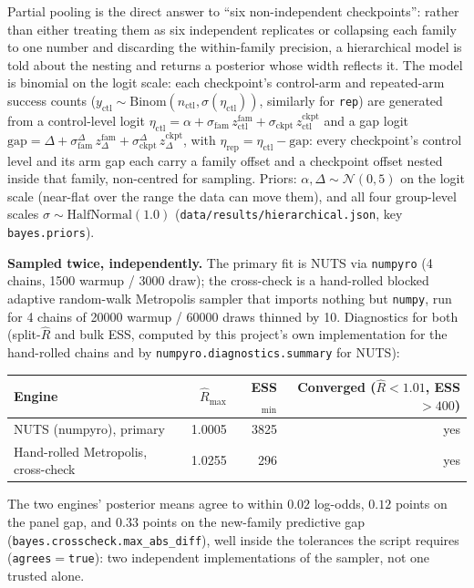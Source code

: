 \documentclass[11pt]{article}
\begin{document}
Partial pooling is the direct answer to ``six non-independent checkpoints'':
rather than either treating them as six independent replicates or collapsing
each family to one number and discarding the within-family precision, a
hierarchical model is told about the nesting and returns a posterior whose
width reflects it. The model is binomial on the logit scale: each checkpoint's
control-arm and repeated-arm success counts
($y_{\mathrm{ctl}}\sim\mathrm{Binom}(n_{\mathrm{ctl}},\sigma(\eta_{\mathrm{ctl}}))$,
similarly for \texttt{rep}) are generated from a control-level logit
$\eta_{\mathrm{ctl}} = \alpha + \sigma_{\mathrm{fam}}\,z^{\mathrm{fam}}_{\mathrm{ctl}} +
\sigma_{\mathrm{ckpt}}\,z^{\mathrm{ckpt}}_{\mathrm{ctl}}$ and a gap logit
$\mathrm{gap} = \Delta + \sigma_{\mathrm{fam}}^{\Delta}\,z^{\mathrm{fam}}_{\Delta} +
\sigma_{\mathrm{ckpt}}^{\Delta}\,z^{\mathrm{ckpt}}_{\Delta}$, with
$\eta_{\mathrm{rep}} = \eta_{\mathrm{ctl}} - \mathrm{gap}$: every checkpoint's
control level and its arm gap each carry a family offset and a checkpoint
offset nested inside that family, non-centred for sampling. Priors: $\alpha,
\Delta \sim \mathcal{N}(0,5)$ on the logit scale (near-flat over the range the
data can move them), and all four group-level scales
$\sigma\sim\mathrm{HalfNormal}(1.0)$ (\texttt{data/results/hierarchical.json},
key \texttt{bayes.priors}).

\noindent\textbf{Sampled twice, independently.} The primary fit is NUTS via
\texttt{numpyro} (4 chains, 1500 warmup / 3000 draw); the cross-check is a
hand-rolled blocked adaptive random-walk Metropolis sampler that imports
nothing but \texttt{numpy}, run for 4 chains of 20000 warmup / 60000 draws
thinned by 10. Diagnostics for both (split-$\hat R$ and bulk ESS, computed by
this project's own implementation for the hand-rolled chains and by
\texttt{numpyro.diagnostics.summary} for NUTS):

\begin{center}
\begin{tabular}{@{}lrrr@{}}
\toprule
Engine & $\hat R_{\max}$ & ESS$_{\min}$ & Converged ($\hat R<1.01$, ESS$>400$) \\
\midrule
NUTS (numpyro), primary & 1.0005 & 3825 & yes \\
Hand-rolled Metropolis, cross-check & 1.0255 & 296 & yes \\
\bottomrule
\end{tabular}
\end{center}

The two engines' posterior means agree to within $0.02$ log-odds, $0.12$ points
on the panel gap, and $0.33$ points on the new-family predictive gap
(\texttt{bayes.crosscheck.max\_abs\_diff}), well inside the tolerances the
script requires (\texttt{agrees}$=$\texttt{true}): two independent
implementations of the sampler, not one trusted alone.
\end{document}
